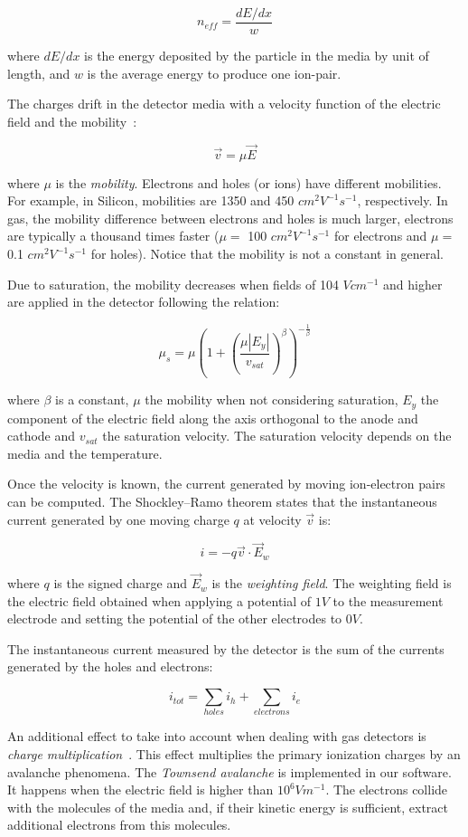 \documentclass[11pt]{article}
\begin{document}
	\[n_{eff} = \frac{dE/dx}{w} \]

	where $dE/dx$ is the energy deposited by the particle in the media by
	unit of length, and $w$ is the average energy to produce one ion-pair.

	The charges drift in the detector media with a velocity function of the electric
	field and the mobility~\cite{spieler2005semiconductor}:

	\[\vec{v} = \mu \vec{E}\]

	where $\mu$ is the \textit{mobility}. Electrons and holes (or ions) have different
	mobilities. For example, in Silicon, mobilities are 1350 and 450 $cm^2V^{-1}s^{-1}$,
	respectively. In gas, the mobility difference between electrons and holes is
	much larger, electrons are typically a thousand times faster ($\mu =$ 100 $cm^2V^{-1}s^{-1}$
	for electrons and $\mu =$ 0.1 $cm^2V^{-1}s^{-1}$ for holes). Notice that the mobility
	is not a constant in general.

	Due to saturation, the mobility decreases when fields of 104 $V cm^{-1}$ and higher are applied in
	the detector following the relation:

	\[\mu_s = \mu \left (1 + \left (\frac{\mu |E_y|}{v_{sat}} \right )^{\beta} \right )^{-\frac{1}{\beta}}\]

	where $\beta$ is a constant, $\mu$ the mobility when not considering saturation,
	$E_y$ the component of the electric field along the axis orthogonal to the anode and cathode
	and $v_{sat}$ the saturation velocity. The saturation velocity depends on the
	media and the temperature.

	Once the velocity is known, the current generated by moving ion-electron
	pairs can be computed. The Shockley–Ramo theorem states that the instantaneous current generated
	by one moving charge $q$ at velocity $\vec{v}$ is:

	\[i = -q \vec{v} \cdot \vec{E}_w\]

	where $q$ is the signed charge and $\vec{E}_w$ is the \textit{weighting field}. The weighting field is the electric field
	obtained when applying a potential of $1V$ to the measurement electrode and setting
	the potential of the other electrodes to $0V$.

	The instantaneous current measured
	by the detector is the sum of the currents generated by the holes and electrons:

	\[i_{tot} = \sum_{holes} i_h + \sum_{electrons} i_e\]

	An additional effect to take into account  when dealing with gas detectors is
	\textit{charge multiplication}~\cite{lphy2236}. This effect
	multiplies the primary ionization charges by an avalanche phenomena.
	The \textit{Townsend avalanche} is implemented in our software. It happens
	when the electric field is higher than $10^6Vm^{-1}$. The electrons collide
	with the molecules of the media and, if their kinetic energy is sufficient,
	extract additional electrons from this molecules.
\end{document}
